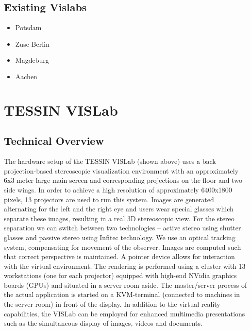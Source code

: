\subsection{Existing Vislabs}
\label{existing-vislabs}

\begin{itemize}
\itemsep1pt\parskip0pt
\item
  Potsdam
\item
  Zuse Berlin
\item
  Magdeburg
\item
  Aachen
\end{itemize}

\section{TESSIN VISLab}
\label{tessin-vislab}

\subsection{Technical Overview}
\label{technical-overview}

The hardware setup of the TESSIN VISLab (shown above) uses a back
projection-based stereoscopic visualization environment with an
approximately 6x3 meter large main screen and corresponding projections
on the floor and two side wings. In order to achieve a high resolution
of approximately 6400x1800 pixels, 13 projectors are used to run this
system. Images are generated alternating for the left and the right eye
and users wear special glasses which separate these images, resulting in
a real 3D stereoscopic view. For the stereo separation we can switch
between two technologies -- active stereo using shutter glasses and
passive stereo using Infitec technology. We use an optical tracking
system, compensating for movement of the observer. Images are computed
such that correct perspective is maintained. A pointer device allows for
interaction with the virtual environment. The rendering is performed
using a cluster with 13 workstations (one for each projector) equipped
with high-end NVidia graphics boards (GPUs) and situated in a server
room aside. The master/server process of the actual application is
started on a KVM-terminal (connected to machines in the server room) in
front of the display. In addition to the virtual reality capabilities,
the VISLab can be employed for enhanced multimedia presentations such as
the simultaneous display of images, videos and documents.

